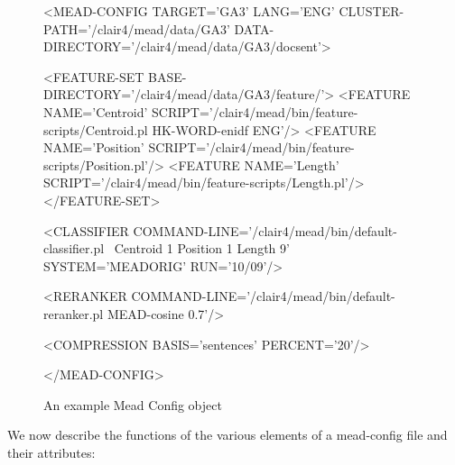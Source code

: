 \documentclass[10pt]{article}
\begin{document}
\begin{figure}[htp!]
\centering
\begin{boxedverbatim}
<MEAD-CONFIG TARGET='GA3' LANG='ENG' CLUSTER-PATH='/clair4/mead/data/GA3'
  DATA-DIRECTORY='/clair4/mead/data/GA3/docsent'>

<FEATURE-SET BASE-DIRECTORY='/clair4/mead/data/GA3/feature/'>
  <FEATURE NAME='Centroid'
SCRIPT='/clair4/mead/bin/feature-scripts/Centroid.pl HK-WORD-enidf ENG'/>
  <FEATURE NAME='Position'
SCRIPT='/clair4/mead/bin/feature-scripts/Position.pl'/>
  <FEATURE NAME='Length'
SCRIPT='/clair4/mead/bin/feature-scripts/Length.pl'/>
</FEATURE-SET>

<CLASSIFIER COMMAND-LINE='/clair4/mead/bin/default-classifier.pl \
  Centroid 1 Position 1 Length 9' SYSTEM='MEADORIG' RUN='10/09'/>

<RERANKER COMMAND-LINE='/clair4/mead/bin/default-reranker.pl MEAD-cosine 0.7'/>

<COMPRESSION BASIS='sentences' PERCENT='20'/>

</MEAD-CONFIG>
\end{boxedverbatim}
\caption{An example Mead Config object}
\label{figure:meadconfig-example}
\end{figure}


We now describe the functions of the various elements of a
mead-config file and their attributes:
\end{document}
